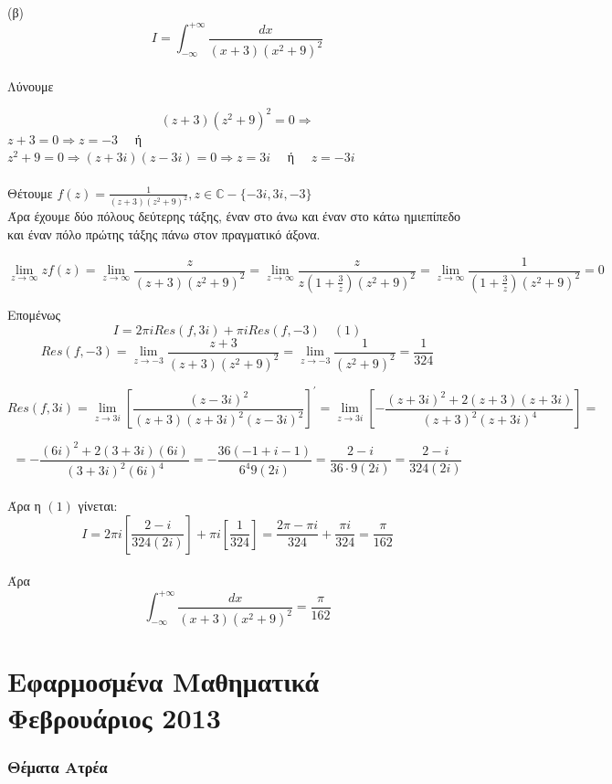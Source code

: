 \documentclass[12pt]{article}
\begin{document}
(β)
$$I= \int_{-\infty}^{+\infty} \frac{dx}{(x+3)(x^2+9)^2}$$
\\ Λύνουμε

$$ (z+3)(z^2+9)^2=0 \Rightarrow$$ 
$
z+3=0\Rightarrow z=-3 \quad $ ή $ \quad$ 
\\
$ z^2+9=0\Rightarrow (z+3i)(z-3i)=0 \Rightarrow z=3i \quad$ ή $ \quad z=-3i$
\\
\\
Θέτουμε $ f(z)=\frac{1}{(z+3)(z^2+9)^2},z\in\mathbb{C}-\{-3i,3i,-3\} $
\\
Άρα έχουμε δύο πόλους δεύτερης τάξης, έναν στο άνω και έναν στο κάτω ημιεπίπεδο και έναν πόλο πρώτης τάξης πάνω στον πραγματικό άξονα.

$$ \lim_{z \to \infty } zf(z)=\lim_{z \to \infty } \frac{z}{(z+3)(z^2+9)^2}=
\lim_{z \to \infty } \frac{z}{z\left(1+\frac{3}{z}\right)(z^2+9)^2}=
\lim_{z \to \infty } \frac{1}{\left(1+\frac{3}{z}\right)(z^2+9)^2}=0$$

Επομένως $$ Ι= 2 \pi i Res(f,3i)+ \pi i Res(f,-3)\quad (1) $$
$$  Res(f,-3)=\lim_{z\to -3}\frac{z+3}{(z+3)(z^2+9)^2}=\lim_{z\to -3}\frac{1}{(z^2+9)^2}=\frac{1}{324}$$

$$ Res(f,3i)=\lim_{z\to 3i} \left[ \frac{(z-3i)^2}{(z+3)(z+3i)^2(z-3i)^2} \right]^{'}= \lim_{z\to 3i} \left[-\frac{(z+3i)^2+2(z+3)(z+3i)}{(z+3)^2(z+3i)^4}\right]=$$

$$= -\frac{(6i)^2+2(3+3i)(6i)}{(3+3i)^2(6i)^4}= -\frac{36(-1+i-1)}{6^4 9(2i)}= \frac{2-i}{36\cdot 9(2i)}=\frac{2-i}{324(2i)} $$
\\
Άρα η $(1)$ γίνεται:
\\
$$ Ι=2\pi i \left[ \frac{2-i}{324(2i)} \right] + \pi i \left[ \frac{1}{324} \right] = \frac{ 2\pi -\pi i}{324} + \frac{ \pi i}{324}= \frac{ \pi}{162}$$
\\
Άρα $$ \int_{-\infty}^{+\infty} \frac{dx}{(x+3)(x^2+9)^2}=\frac{ \pi}{162} $$

\newpage
\part{Εφαρμοσμένα Μαθηματικά Φεβρουάριος 2013}
\author{}


\maketitle
\newpage
 

 \section{Θέματα Ατρέα}
\end{document}
